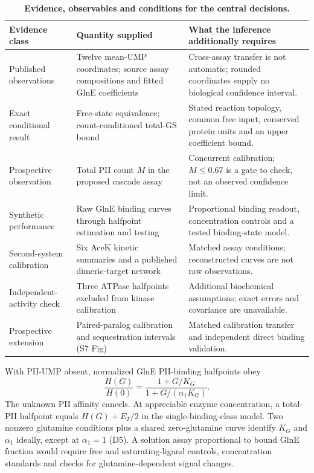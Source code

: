 \documentclass[10pt,letterpaper]{article}
\begin{document}
\begin{table}[!ht]\doublespacing

\caption{\textbf{Evidence, observables and conditions for the central decisions.}}
\small\begin{tabular}{>{\raggedright\arraybackslash}p{}>{\raggedright\arraybackslash}p{}>{\raggedright\arraybackslash}p{}}\toprule
Evidence class & Quantity supplied & What the inference additionally requires \\\midrule
Published observations & Twelve mean-UMP coordinates; source assay compositions and fitted GlnE coefficients & Cross-assay transfer is not automatic; rounded coordinates supply no biological confidence interval. \\
Exact conditional result & Free-state equivalence; count-conditioned total-GS bound & Stated reaction topology, common free input, conserved protein units and an upper coefficient bound. \\
Prospective observation & Total PII count $M$ in the proposed cascade assay & Concurrent calibration; $M\leq0.67$ is a gate to check, not an observed confidence limit. \\
Synthetic performance & Raw GlnE binding curves through halfpoint estimation and testing & Proportional binding readout, concentration controls and a tested binding-state model. \\
Second-system calibration & Six AceK kinetic summaries and a published dimeric-target network & Matched assay conditions; reconstructed curves are not raw observations. \\
Independent-activity check & Three ATPase halfpoints excluded from kinase calibration & Additional biochemical assumptions; exact errors and covariance are unavailable. \\
Prospective extension & Paired-paralog calibration and sequestration intervals (S7 Fig) & Matched calibration transfer and independent direct binding validation. \\\bottomrule\end{tabular}
\end{table}

With PII-UMP absent, normalized GlnE PII-binding halfpoints obey
\[
 \frac{H(G)}{H(0)}=\frac{1+G/K_G}{1+G/(\alpha_1K_G)}.
\]
The unknown PII affinity cancels. At appreciable enzyme concentration, a total-PII halfpoint equals $H(G)+E_T/2$ in the single-binding-class model. Two nonzero glutamine conditions plus a shared zero-glutamine curve identify $K_G$ and $\alpha_1$ ideally, except at $\alpha_1=1$ (D5). A solution assay proportional to bound GlnE fraction would require free and saturating-ligand controls, concentration standards and checks for glutamine-dependent signal changes.
\end{document}
